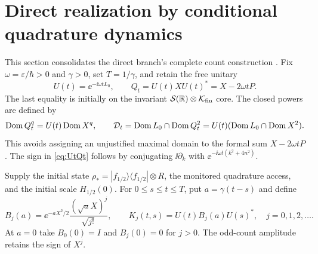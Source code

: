 \section{Direct realization by conditional quadrature dynamics}\label{sec:direct}

This section consolidates the direct branch's complete count construction
\cite{TNDDirect,TNDDirectReview}. Fix $\omega=\varepsilon/\hbar>0$ and
$\gamma>0$, set $T=1/\gamma$, and retain the free unitary
\begin{equation}\label{eq:UtQt}
 U(t)=\ee^{-\ii\omega tL_0},\qquad
 Q_t=U(t)XU(t)^*=X-2\omega tP.
\end{equation}
The last equality is initially on the invariant
$\mathcal S(\mathbb R)\otimes\mathcal K_{\rm fin}$ core. The closed powers are defined by
\begin{equation}\label{eq:Qdomains}
 \operatorname{Dom} Q_t^q=U(t)\operatorname{Dom} X^q,\qquad
 \mathcal D_t=\operatorname{Dom} L_0\cap\operatorname{Dom} Q_t^2
 =U(t)(\operatorname{Dom} L_0\cap\operatorname{Dom} X^2).
\end{equation}
This avoids assigning an unjustified maximal domain to the formal sum
$X-2\omega tP$. The sign in \eqref{eq:UtQt} follows by conjugating
$\ii\partial_k$ with $\ee^{-\ii\omega t(k^2+4n^2)}$.

Supply the initial state
$\rho_*=|f_{1/2}\rangle\langle f_{1/2}|\otimes R$, the monitored
quadrature access, and the initial scale $H_{1/2}(0)$. For
$0\le s\le t\le T$, put $a=\gamma(t-s)$ and define
\begin{equation}\label{eq:Kraus}
 B_j(a)=\ee^{-aX^2/2}\frac{(\sqrt aX)^j}{\sqrt{j!}},\qquad
 K_j(t,s)=U(t)B_j(a)U(s)^*,\quad j=0,1,2,\ldots.
\end{equation}
At $a=0$ take $B_0(0)=I$ and $B_j(0)=0$ for $j>0$.
The odd-count amplitude retains the sign of $X^j$.

